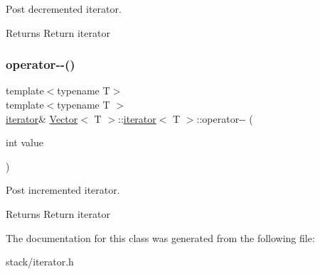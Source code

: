 Post decremented iterator. 

\begin{DoxyReturn}{Returns}
Return iterator 
\end{DoxyReturn}
\mbox{\label{classVector_1_1iterator_ab9fe4e94caea68d0460baebb6c224bb6}} 
\subsubsection{\texorpdfstring{operator-\/-\/()}{operator--()}\hspace{0.1cm}{\footnotesize\ttfamily [4/4]}}
{\footnotesize\ttfamily template$<$typename T$>$ \\
template$<$typename T $>$ \\
\hyperlink{classVector_1_1iterator}{iterator}\& \hyperlink{classVector}{Vector}$<$ T $>$\+::\hyperlink{classVector_1_1iterator}{iterator}$<$ T $>$\+::operator-\/-\/ (\begin{DoxyParamCaption}\item[{int}]{value }\end{DoxyParamCaption})\hspace{0.3cm}{\ttfamily [inline]}}



Post incremented iterator. 

\begin{DoxyReturn}{Returns}
Return iterator 
\end{DoxyReturn}


The documentation for this class was generated from the following file\+:\begin{DoxyCompactItemize}
\item 
stack/iterator.\+h\end{DoxyCompactItemize}

